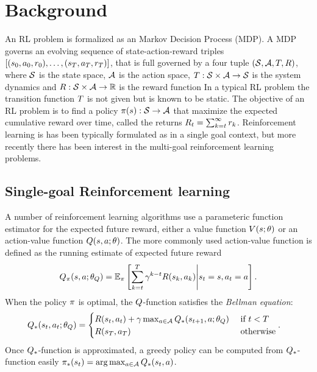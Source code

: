 \section{Background}

An RL problem is formalized as an Markov Decision Process (MDP). A MDP governs
an evolving sequence of state-action-reward triples $[(s_0, a_0,
r_0), \dots, (s_T, a_T, r_T)]$, that is full governed
by a four tuple $(\mathcal{S}, \mathcal{A}, T, R)$, where $\mathcal{S}$ is the
state space, $\mathcal{A}$ is the action space, $T : \mathcal{S} \times \mathcal{A}
\rightarrow \mathcal{S}$ is the system dynamics and $R : \mathcal{S} \times \mathcal{A}
\rightarrow \mathbb{R} $ is the reward function
In a typical RL problem the transition function $T$ is not given but is
known to be static.
The objective of an RL problem is to find a policy $\pi(s): \mathcal{S}
\rightarrow \mathcal{A}$ that
maximize the expected cumulative
reward over time, called the returns  $R_t = \sum_{k=t}^{\infty} r_{k}$.
Reinforcement learning is has been typically formulated as in a single goal
context, but more recently there has been interest in the multi-goal
reinforcement learning problems.


\subsection{Single-goal Reinforcement learning}

A number of reinforcement learning algorithms use a parameteric function
estimator for the expected future reward, either a value function
$V(s; \theta)$ or an action-value function $Q(s, a; \theta)$.
The more commonly used action-value function is defined as the running estimate
of expected future reward
%
\begin{align}
Q_\pi(s, a; \theta_Q) = \mathbb{E}_\pi\left[ \sum_{k=t}^T
  \gamma^{k-t} R(s_k, a_k)
  \middle| s_t = s, a_t = a \right] .
  \label{eq:q-def}
\end{align}%
%
When the policy $\pi$ is optimal, the $Q$-function satisfies the
\emph{Bellman equation}:
%
\begin{align}
  Q_*(s_t, a_t; \theta_Q)
  &=
    \begin{cases}
      R(s_t, a_t) + \gamma \max_{a \in \mathcal{A}} Q_*(s_{t+1}, a; \theta_Q)
      & \text{ if } t < T
      \\
      R(s_T, a_T) & \text{ otherwise}
    \end{cases}.
  \label{eq:bellman}
\end{align}%
% 
Once $Q_*$-function is approximated, a greedy policy can be computed from $Q_*$-function easily $\pi_*(s_t) = \arg \max_{a \in \mathcal{A}} Q_*(s_t, a)$.

